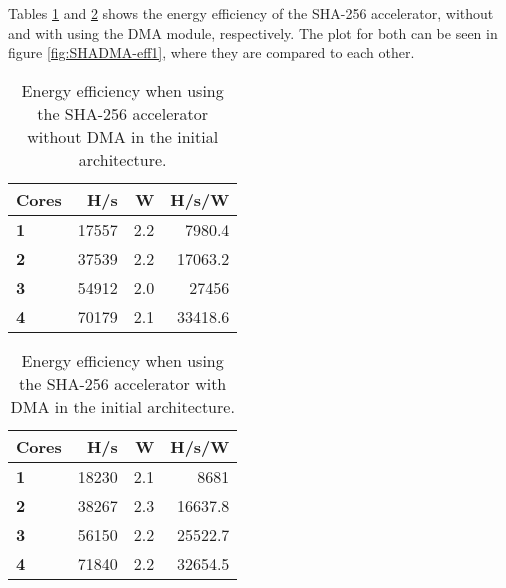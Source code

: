 \begin{appendix}
Tables \ref{tab:SHA-eff1} and \ref{tab:SHADMA-eff1} shows the energy efficiency of the SHA-256 accelerator, without and with using the DMA module, respectively.
The plot for both can be seen in figure \ref{fig:SHADMA-eff1}, where they are compared to each other.

%

\begin{table}
\centering
\begin{tabular}{| l | r | r || r |}
  \hline 
  \textbf{Cores} & \textbf{H/s} & \textbf{W} & \textbf{H/s/W} \\
  \hline                       
  \textbf{1} &  17557 & 2.2 & 7980.4\\
  \textbf{2} &  37539 & 2.2 & 17063.2\\
  \textbf{3} &  54912 & 2.0 & 27456\\
  \textbf{4} &  70179 & 2.1 & 33418.6\\
  \hline 
\end{tabular}
\caption{Energy efficiency when using the SHA-256 accelerator without DMA in the initial architecture.}
\label{tab:SHA-eff1}
\end{table}

\begin{table}
\centering
\begin{tabular}{| l | r | r || r |}
  \hline 
  \textbf{Cores} & \textbf{H/s} & \textbf{W} & \textbf{H/s/W} \\
  \hline                       
  \textbf{1} &  18230 & 2.1 & 8681\\
  \textbf{2} &  38267 & 2.3 & 16637.8\\
  \textbf{3} &  56150 & 2.2 & 25522.7\\
  \textbf{4} &  71840 & 2.2 & 32654.5\\
  \hline 
\end{tabular}
\caption{Energy efficiency when using the SHA-256 accelerator with DMA in the initial architecture.}
\label{tab:SHADMA-eff1}
\end{table}


\end{appendix}
